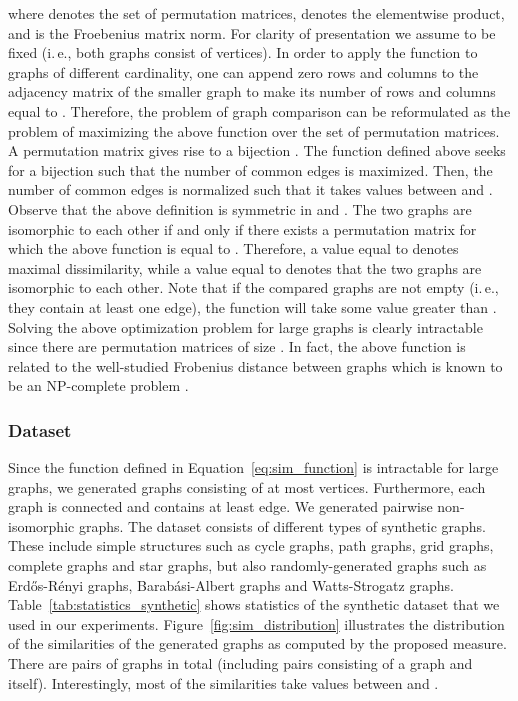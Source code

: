 \documentclass[twoside,11pt]{article}
\newcommand{\ie}{i.\,e., }
\begin{document}
where  denotes the set of  permutation matrices,  denotes the elementwise product, and  is the Froebenius matrix norm.
For clarity of presentation we assume  to be fixed (\ie both graphs consist of  vertices).
In order to apply the function to graphs of different cardinality, one can append zero rows and columns to the adjacency matrix of the smaller graph to make its number of rows and columns equal to .
Therefore, the problem of graph comparison can be reformulated as the problem of maximizing the above function over the set of permutation matrices.
A permutation matrix  gives rise to a bijection .
The function defined above seeks for a bijection such that the number of common edges  is maximized.
Then, the number of common edges is normalized such that it takes values between  and .
Observe that the above definition is symmetric in  and .
The two graphs are isomorphic to each other if and only if there exists a permutation matrix  for which the above function is equal to .
Therefore, a value equal to  denotes maximal dissimilarity, while a value equal to  denotes that the two graphs are isomorphic to each other.
Note that if the compared graphs are not empty (\ie they contain at least one edge), the function will take some value greater than .
Solving the above optimization problem for large graphs is clearly intractable since there are  permutation matrices of size .
In fact, the above function is related to the well-studied Frobenius distance between graphs which is known to be an NP-complete problem .

\subsubsection{Dataset}
Since the function defined in Equation~\eqref{eq:sim_function} is intractable for large graphs, we generated graphs consisting of at most  vertices.
Furthermore, each graph is connected and contains at least  edge.
We generated  pairwise non-isomorphic graphs.
The dataset consists of different types of synthetic graphs.
These include simple structures such as cycle graphs, path graphs, grid graphs, complete graphs and star graphs, but also randomly-generated graphs such as Erd{\H{o}}s-R{\'e}nyi graphs, Barab{\'a}si-Albert graphs and Watts-Strogatz graphs.
Table~\ref{tab:statistics_synthetic} shows statistics of the synthetic dataset that we used in our experiments.
Figure~\ref{fig:sim_distribution} illustrates the distribution of the similarities of the generated graphs as computed by the proposed measure.
There are  pairs of graphs in total (including pairs consisting of a graph and itself).
Interestingly, most of the similarities take values between  and .
\end{document}
